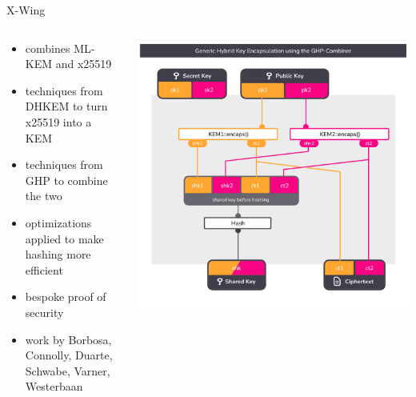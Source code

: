\begin{frame}{X-Wing \citeXwing}
  \begin{columns}[c]
    \begin{column}{.4\linewidth}
      \small
      \begin{itemize}
        \item combines ML-KEM and x25519
        \item techniques from DHKEM to turn x25519 into a KEM
        \item techniques from GHP to combine the two
        \item optimizations applied to make hashing more efficient
        \item bespoke proof of security
        \item work by Borbosa, Connolly, Duarte, Schwabe, Varner, Westerbaan
      \end{itemize}
    \end{column}

    \begin{column}{.6\linewidth}
      \includegraphics[height=.92\textheight,page=3,clip=true,trim={0.5cm 1cm 0.7cm 1.5cm}]{graphics/rosenpass-encapsulation-combiner.pdf}
    \end{column}

  \end{columns}
\end{frame}

